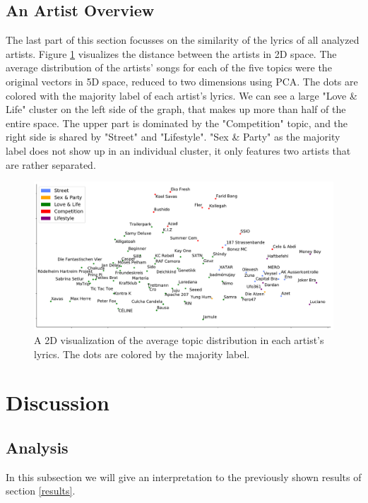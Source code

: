 \documentclass[conference]{IEEEtran}
\begin{document}
\subsection{An Artist Overview}
The last part of this section focusses on the similarity of the lyrics of all analyzed artists. Figure \ref{fig:scatter} visualizes the distance between the artists in 2D space. The average distribution of the artists' songs for each of the five topics were the original vectors in 5D space, reduced to two dimensions using PCA. The dots are colored with the majority label of each artist's lyrics. We can see a large "Love \& Life" cluster on the left side of the graph, that makes up more than half of the entire space. The upper part is dominated by the "Competition" topic, and the right side is shared by "Street" and "Lifestyle". "Sex \& Party" as the majority label does not show up in an individual cluster, it only features two artists that are rather separated.

\begin{figure}[!t]
\includegraphics[width=\linewidth]{figures/scatter.pdf}
\vspace*{-8mm}
\caption{A 2D visualization of the average topic distribution in each artist's lyrics. The dots are colored by the majority label.}
\label{fig:scatter}
\end{figure}

\section{Discussion}
\subsection{Analysis}
In this subsection we will give an interpretation to the previously shown results of section \ref{results}.
\end{document}
